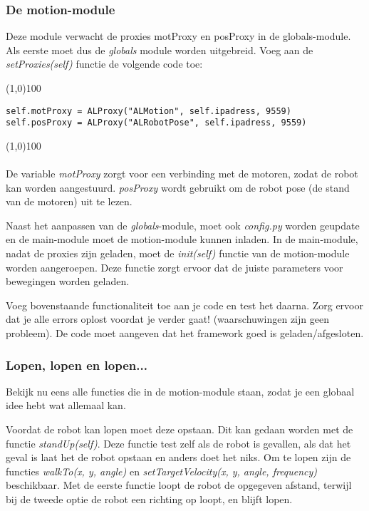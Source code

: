\documentclass[a4paper]{article}
\begin{document}
\subsubsection{De motion-module}
Deze module verwacht de proxies motProxy en posProxy in de globals-module. Als eerste moet dus de \textit{globals} module worden uitgebreid.
Voeg aan de \textit{setProxies(self)} functie de volgende code toe:

\noindent \line(1,0){100}
\begin{verbatim}
self.motProxy = ALProxy("ALMotion", self.ipadress, 9559)
self.posProxy = ALProxy("ALRobotPose", self.ipadress, 9559)
\end{verbatim}
\noindent \line(1,0){100}
\\\\
De variable \textit{motProxy} zorgt voor een verbinding met de motoren, zodat de robot kan worden aangestuurd. \textit{posProxy} wordt gebruikt om de robot pose (de stand van de motoren) uit te lezen. 

Naast het aanpassen van de \textit{globals}-module, moet ook \textit{config.py} worden geupdate en de main-module moet de motion-module kunnen inladen.
In de main-module, nadat de proxies zijn geladen, moet de \textit{init(self)} functie van de motion-module worden aangeroepen. Deze functie zorgt ervoor dat de juiste parameters voor bewegingen worden geladen.

Voeg bovenstaande functionaliteit toe aan je code en test het daarna. Zorg ervoor dat je alle errors oplost voordat je verder gaat! (waarschuwingen zijn geen probleem). De code moet aangeven dat het framework goed is geladen/afgesloten.

\subsubsection{Lopen, lopen en lopen...}
Bekijk nu eens alle functies die in de motion-module staan, zodat je een globaal idee hebt wat allemaal kan.

Voordat de robot kan lopen moet deze opstaan. Dit kan gedaan worden met de functie \textit{standUp(self)}.
Deze functie test zelf als de robot is gevallen, als dat het geval is laat het de robot opstaan en anders doet het niks.
Om te lopen zijn de functies \textit{walkTo(x, y, angle)} en \textit{setTargetVelocity(x, y, angle, frequency)} beschikbaar.
Met de eerste functie loopt de robot de opgegeven afstand, terwijl bij de tweede optie de robot een richting op loopt, en blijft lopen.
\end{document}
